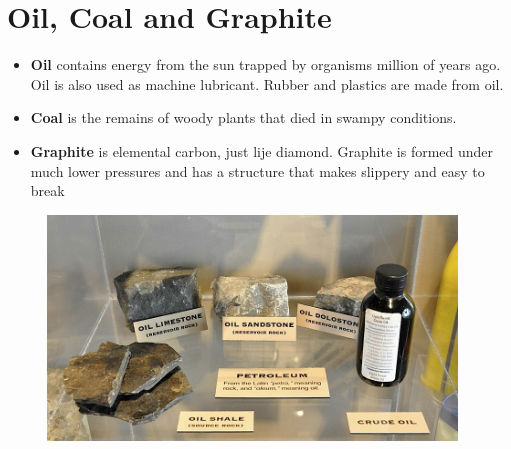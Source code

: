 \documentclass[12pt, letterpaper]{article}
\begin{document}
\section{Oil, Coal and Graphite}
	\begin{itemize}
		\item \textbf{Oil} contains energy from the sun trapped by organisms million of years ago. Oil is also used as machine lubricant. Rubber and plastics are made from oil.
		\item \textbf{Coal} is the remains of woody plants that died in swampy conditions.
		\item \textbf{Graphite} is elemental carbon, just lije diamond. Graphite is formed under much lower pressures and has a structure that makes slippery and easy to break
	\end{itemize}
	
	\begin{figure}[h]
		\includegraphics[height=6cm]{shelf12}
		\centering
	\end{figure}
\end{document}
